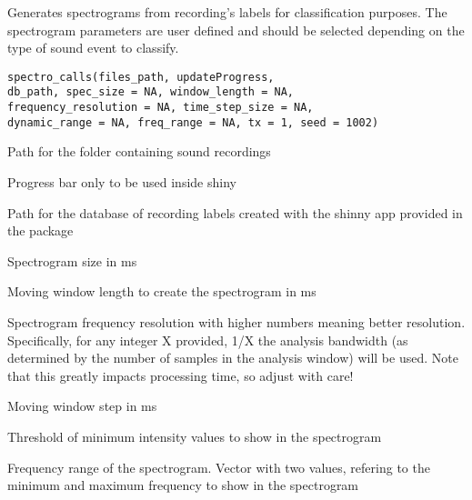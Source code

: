 \documentclass[letterpaper]{book}
\begin{document}
%
\begin{Description}\relax
Generates spectrograms from recording's labels for
classification purposes. The spectrogram parameters are user defined
and should be selected depending on the type of sound event to classify.
\end{Description}
%
\begin{Usage}
\begin{verbatim}
spectro_calls(files_path, updateProgress,
db_path, spec_size = NA, window_length = NA,
frequency_resolution = NA, time_step_size = NA, 
dynamic_range = NA, freq_range = NA, tx = 1, seed = 1002)
\end{verbatim}
\end{Usage}
%
\begin{Arguments}
\begin{ldescription}
\item[\code{files\_path}] Path for the folder containing sound recordings

\item[\code{updateProgress}] Progress bar only to be used inside shiny

\item[\code{db\_path}] Path for the database of recording labels created with the
shinny app provided in the package

\item[\code{spec\_size}] Spectrogram size in ms

\item[\code{window\_length}] Moving window length to create the spectrogram in ms

\item[\code{frequency\_resolution}] Spectrogram frequency resolution with higher
numbers meaning better resolution. Specifically, for any integer X provided,
1/X the analysis bandwidth (as determined by the number of samples
in the analysis window) will be used. Note that this greatly impacts
processing time, so adjust with care!

\item[\code{time\_step\_size}] Moving window step in ms

\item[\code{dynamic\_range}] Threshold of minimum intensity values to show
in the spectrogram

\item[\code{freq\_range}] Frequency range of the spectrogram. Vector with two values,
refering to the minimum and maximum frequency to show in the spectrogram


\end{ldescription}
\end{Arguments}
\end{document}
